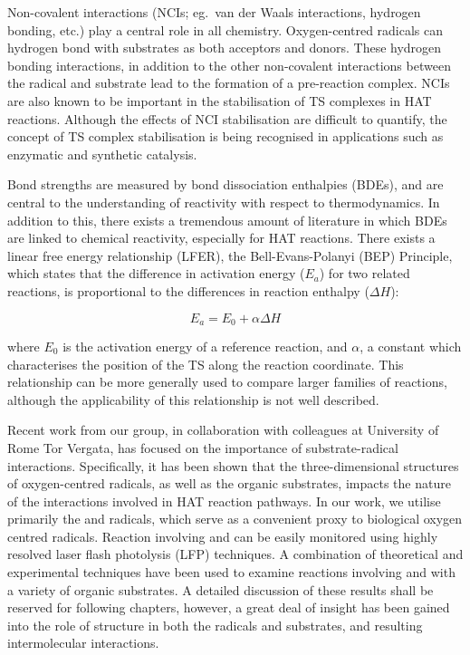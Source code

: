 Non-covalent interactions (NCIs; eg.\ van der Waals interactions, hydrogen bonding, etc.)  play a central role in all chemistry. Oxygen-centred radicals can hydrogen bond with substrates as both acceptors and donors.\cite{Johnson2009a} These hydrogen bonding interactions, in addition to the other non-covalent interactions between the radical and substrate lead to the formation of a pre-reaction complex. NCIs are also known to be important in the stabilisation of TS complexes in HAT reactions.\cite{DiLabio2005,DiLabio2007} Although the effects of NCI stabilisation are difficult to quantify, the concept of TS complex stabilisation is being recognised in applications such as enzymatic\cite{Uyeda2011} and synthetic catalysis.\cite{Bakr2016}

Bond strengths are measured by bond dissociation enthalpies (BDEs), and are central to the understanding of reactivity with respect to thermodynamics. In addition to this, there exists a tremendous amount of literature in which BDEs are linked to chemical reactivity, especially for HAT reactions.\cite{Kochi1973,Tedder1982,Wijtmans2003,Pratt2004,Mayer2004} There exists a linear free energy relationship (LFER), the Bell-Evans-Polanyi (BEP) Principle,\cite{Bell1936,Evans1938} which states that the difference in activation energy ($E_a$) for two related reactions, is proportional to the differences in reaction enthalpy ($\Delta H$):

\begin{equation}
  E_a = E_0 + \alpha \Delta H
  \label{eq:bep}
\end{equation}

\noindent where $E_0$ is the activation energy of a reference reaction, and $\alpha$, a constant which characterises the position of the TS along the reaction coordinate. This relationship can be more generally used to compare larger families of reactions, although the applicability of this relationship is not well described.

Recent work from our group, in collaboration with colleagues at University of Rome Tor Vergata, has focused on the importance of substrate-radical interactions. Specifically, it has been shown that the three-dimensional structures of oxygen-centred radicals, as well as the organic substrates, impacts the nature of the interactions involved in HAT reaction pathways.\cite{Salamone2015Rev} In our work, we utilise primarily the \bno and \cumo radicals, which serve as a convenient proxy to biological oxygen centred radicals. Reaction involving \bno and \cumo can be easily monitored using highly resolved laser flash photolysis (LFP) techniques. A combination of theoretical and experimental techniques have been used to examine reactions involving \bno and \cumo with a variety of organic substrates. A detailed discussion of these results shall be reserved for following chapters, however, a great deal of insight has been gained into the role of structure in both the radicals and substrates, and resulting intermolecular interactions.

